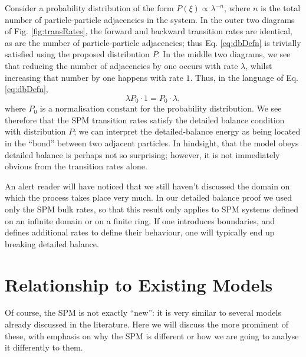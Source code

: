 Consider a probability distribution of the form $P(\xi) \propto \lambda^{-n}$, where $n$ is the total
number of particle-particle adjacencies in the system. In the outer two diagrams of 
Fig. \ref{fig:transRates}, the forward and backward transition rates are identical, as are the number of
particle-particle adjacencies; thus Eq. \eqref{eq:dbDefn} is trivially satisfied using the proposed 
distribution $P$. In the middle two diagrams, we see that reducing the number of adjacencies by one
occurs with rate $\lambda$, whilst increasing that number by one happens with rate $1$. Thus, in the 
language of Eq. \eqref{eq:dbDefn},
\begin{equation}
 \lambda P_0 \cdot 1 = P_0 \cdot \lambda,
\end{equation}
where $P_0$ is a normalisation constant for the probability distribution. We see therefore that the SPM
transition rates satisfy the detailed balance condition with distribution $P$; we can interpret the 
detailed-balance energy as being located in the ``bond'' between two adjacent particles. In hindsight,
that the model obeys detailed balance is perhaps not so surprising; however, it is not immediately 
obvious from the transition rates alone.

An alert reader will have noticed that we still haven't discussed the domain on which the process takes 
place very much. In our detailed balance proof we used only the SPM bulk rates, 
so that this result only
applies to SPM systems defined on an infinite domain or on a finite ring. If one introduces boundaries,
and defines additional rates to define their behaviour, one will typically end up breaking detailed 
balance.

\section{Relationship to Existing Models} \label{sec:existingModels}
Of course, the SPM is not exactly ``new'': it is very similar to several models already discussed in the
literature. Here we will discuss the more prominent of these, with emphasis on why the SPM is different or
how we are going to analyse it differently to them.
